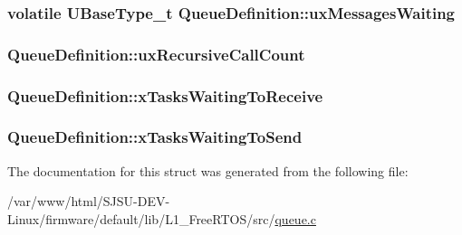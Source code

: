 \subsubsection[{\texorpdfstring{ux\+Messages\+Waiting}{uxMessagesWaiting}}]{\setlength{\rightskip}{0pt plus 5cm}volatile {\bf U\+Base\+Type\+\_\+t} Queue\+Definition\+::ux\+Messages\+Waiting}\hypertarget{structQueueDefinition_a12b07a40152d0f21488ca06d362d13d1}{}\label{structQueueDefinition_a12b07a40152d0f21488ca06d362d13d1}
\subsubsection[{\texorpdfstring{ux\+Recursive\+Call\+Count}{uxRecursiveCallCount}}]{ Queue\+Definition\+::ux\+Recursive\+Call\+Count}\hypertarget{structQueueDefinition_a2cf88e286477f6f89fe1009d722dc4cf}{}\label{structQueueDefinition_a2cf88e286477f6f89fe1009d722dc4cf}
\subsubsection[{\texorpdfstring{x\+Tasks\+Waiting\+To\+Receive}{xTasksWaitingToReceive}}]{ Queue\+Definition\+::x\+Tasks\+Waiting\+To\+Receive}\hypertarget{structQueueDefinition_af6d61526f77beee659cd604a0c473359}{}\label{structQueueDefinition_af6d61526f77beee659cd604a0c473359}
\subsubsection[{\texorpdfstring{x\+Tasks\+Waiting\+To\+Send}{xTasksWaitingToSend}}]{ Queue\+Definition\+::x\+Tasks\+Waiting\+To\+Send}\hypertarget{structQueueDefinition_aaab135c4345cb0393d6ff3cd5164c7b2}{}\label{structQueueDefinition_aaab135c4345cb0393d6ff3cd5164c7b2}


The documentation for this struct was generated from the following file\+:\begin{DoxyCompactItemize}
\item 
/var/www/html/\+S\+J\+S\+U-\/\+D\+E\+V-\/\+Linux/firmware/default/lib/\+L1\+\_\+\+Free\+R\+T\+O\+S/src/\hyperlink{queue_8c}{queue.\+c}\end{DoxyCompactItemize}
